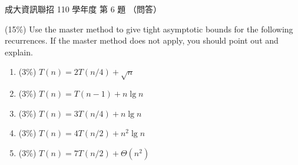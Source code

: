 \begin{pastexam}[label={px:ncku-110-prog-06}]{成大資訊聯招 110 學年度 第 6 題}
（問答）

(15\%) Use the master method to give tight asymptotic bounds for the following recurrences. If
the master method does not apply, you should point out and explain.
\begin{enumerate}[label=(\arabic*),itemsep=0pt,topsep=2pt]
\item (3\%) $T(n)=2T(n/4)+\sqrt{n}$
\item (3\%) $T(n)=T(n-1)+n\lg n$
\item (3\%) $T(n)=3T(n/4)+n\lg n$
\item (3\%) $T(n)=4T(n/2)+n^2\lg n$
\item (3\%) $T(n)=7T(n/2)+\Theta(n^2)$
\end{enumerate}
\end{pastexam}

